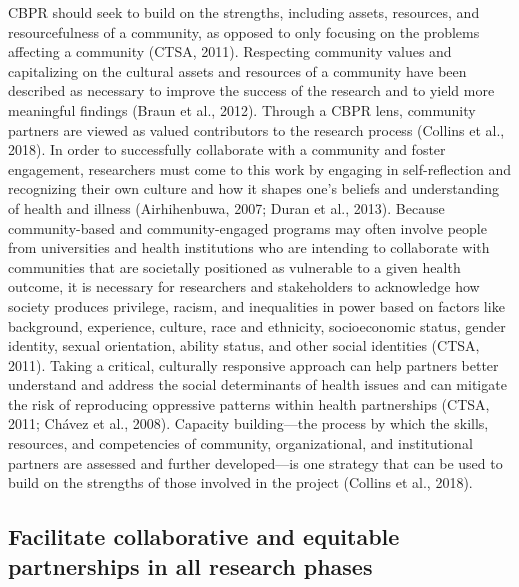 \documentclass[
  11pt,
]{book}
\begin{document}
CBPR should seek to build on the strengths, including assets, resources, and resourcefulness of a community, as opposed to only focusing on the problems affecting a community (CTSA, 2011). Respecting community values and capitalizing on the cultural assets and resources of a community have been described as necessary to improve the success of the research and to yield more meaningful findings (Braun et al., 2012). Through a CBPR lens, community partners are viewed as valued contributors to the research process (Collins et al., 2018). In order to successfully collaborate with a community and foster engagement, researchers must come to this work by engaging in self-reflection and recognizing their own culture and how it shapes one's beliefs and understanding of health and illness (Airhihenbuwa, 2007; Duran et al., 2013). Because community-based and community-engaged programs may often involve people from universities and health institutions who are intending to collaborate with communities that are societally positioned as vulnerable to a given health outcome, it is necessary for researchers and stakeholders to acknowledge how society produces privilege, racism, and inequalities in power based on factors like background, experience, culture, race and ethnicity, socioeconomic status, gender identity, sexual orientation, ability status, and other social identities (CTSA, 2011). Taking a critical, culturally responsive approach can help partners better understand and address the social determinants of health issues and can mitigate the risk of reproducing oppressive patterns within health partnerships (CTSA, 2011; Chávez et al., 2008). Capacity building---the process by which the skills, resources, and competencies of community, organizational, and institutional partners are assessed and further developed---is one strategy that can be used to build on the strengths of those involved in the project (Collins et al., 2018).

\hypertarget{facilitate-collaborative-and-equitable-partnerships-in-all-research-phases}{%
\subsection{Facilitate collaborative and equitable partnerships in all research phases}\label{facilitate-collaborative-and-equitable-partnerships-in-all-research-phases}}
\end{document}
